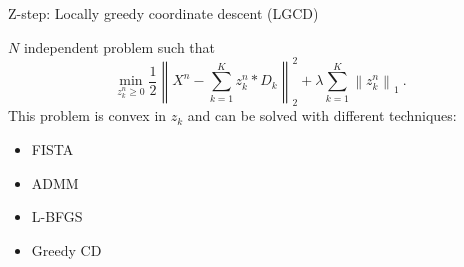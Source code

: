 \documentclass{beamer}
\def\keypoint#1{\hspace{0pt plus 1 filll}\textcolor{gray}{#1}}
\def\mycite#1{\keypoint{\small\citep{#1}}}
\begin{document}
\begin{frame}{Z-step: Locally greedy coordinate descent (LGCD)}

$N$ independent problem such that
\[
	\label{eq:sparse_code}
	\min_{z_k^n \ge 0} \frac{1}{2} \left\|X^n - \sum_{k=1}^K z_k^n * D_k\right\|_2^2
	+ \lambda\sum_{k=1}^K\left\|z_k^n\right\|_1~.
\]
This problem is convex in $z_k$ and can be solved with different techniques:
\begin{itemize}
	\item FISTA \mycite{Chalasani2013}
	\item ADMM \mycite{Bristow2013}
	\item L-BFGS \mycite{Jas2017}
	\item Greedy CD \mycite{Kavukcuoglu2010}
\end{itemize}


\end{frame}
\end{document}
